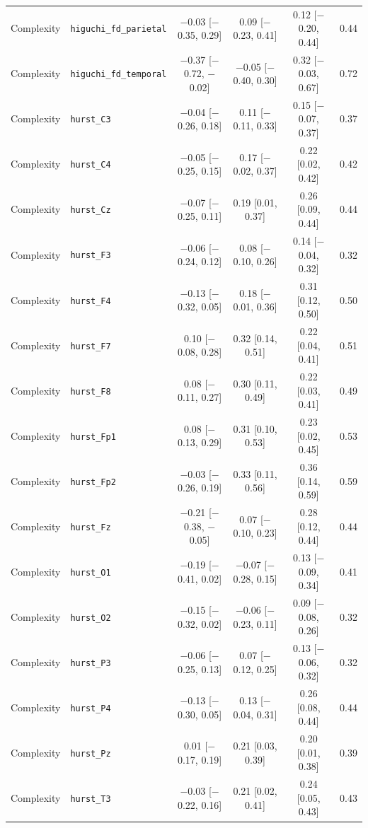 {\begin{longtable}{llcccc}
Complexity & \texttt{higuchi\_fd\_parietal} & $-$0.03 [$-$0.35, 0.29] & 0.09 [$-$0.23, 0.41] & 0.12 [$-$0.20, 0.44] & 0.44 \\
Complexity & \texttt{higuchi\_fd\_temporal} & $-$0.37 [$-$0.72, $-$0.02] & $-$0.05 [$-$0.40, 0.30] & 0.32 [$-$0.03, 0.67] & 0.72 \\
Complexity & \texttt{hurst\_C3} & $-$0.04 [$-$0.26, 0.18] & 0.11 [$-$0.11, 0.33] & 0.15 [$-$0.07, 0.37] & 0.37 \\
Complexity & \texttt{hurst\_C4} & $-$0.05 [$-$0.25, 0.15] & 0.17 [$-$0.02, 0.37] & 0.22 [0.02, 0.42] & 0.42 \\
Complexity & \texttt{hurst\_Cz} & $-$0.07 [$-$0.25, 0.11] & 0.19 [0.01, 0.37] & 0.26 [0.09, 0.44] & 0.44 \\
Complexity & \texttt{hurst\_F3} & $-$0.06 [$-$0.24, 0.12] & 0.08 [$-$0.10, 0.26] & 0.14 [$-$0.04, 0.32] & 0.32 \\
Complexity & \texttt{hurst\_F4} & $-$0.13 [$-$0.32, 0.05] & 0.18 [$-$0.01, 0.36] & 0.31 [0.12, 0.50] & 0.50 \\
Complexity & \texttt{hurst\_F7} & 0.10 [$-$0.08, 0.28] & 0.32 [0.14, 0.51] & 0.22 [0.04, 0.41] & 0.51 \\
Complexity & \texttt{hurst\_F8} & 0.08 [$-$0.11, 0.27] & 0.30 [0.11, 0.49] & 0.22 [0.03, 0.41] & 0.49 \\
Complexity & \texttt{hurst\_Fp1} & 0.08 [$-$0.13, 0.29] & 0.31 [0.10, 0.53] & 0.23 [0.02, 0.45] & 0.53 \\
Complexity & \texttt{hurst\_Fp2} & $-$0.03 [$-$0.26, 0.19] & 0.33 [0.11, 0.56] & 0.36 [0.14, 0.59] & 0.59 \\
Complexity & \texttt{hurst\_Fz} & $-$0.21 [$-$0.38, $-$0.05] & 0.07 [$-$0.10, 0.23] & 0.28 [0.12, 0.44] & 0.44 \\
Complexity & \texttt{hurst\_O1} & $-$0.19 [$-$0.41, 0.02] & $-$0.07 [$-$0.28, 0.15] & 0.13 [$-$0.09, 0.34] & 0.41 \\
Complexity & \texttt{hurst\_O2} & $-$0.15 [$-$0.32, 0.02] & $-$0.06 [$-$0.23, 0.11] & 0.09 [$-$0.08, 0.26] & 0.32 \\
Complexity & \texttt{hurst\_P3} & $-$0.06 [$-$0.25, 0.13] & 0.07 [$-$0.12, 0.25] & 0.13 [$-$0.06, 0.32] & 0.32 \\
Complexity & \texttt{hurst\_P4} & $-$0.13 [$-$0.30, 0.05] & 0.13 [$-$0.04, 0.31] & 0.26 [0.08, 0.44] & 0.44 \\
Complexity & \texttt{hurst\_Pz} & 0.01 [$-$0.17, 0.19] & 0.21 [0.03, 0.39] & 0.20 [0.01, 0.38] & 0.39 \\
Complexity & \texttt{hurst\_T3} & $-$0.03 [$-$0.22, 0.16] & 0.21 [0.02, 0.41] & 0.24 [0.05, 0.43] & 0.43 \\

\end{longtable}}
